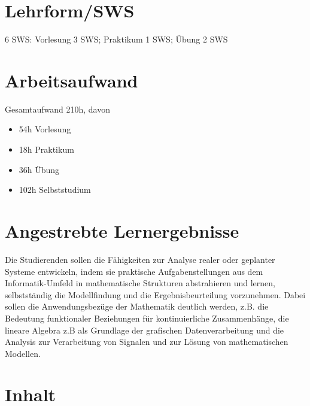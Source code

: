 \section*{Lehrform/SWS\label{/mi-2017/modulbeschreibungen-bachelor/BA_Mathematik1}}\label{lehrformswspathlabelmi-2017modulbeschreibungen-bachelorbaux5fmathematik1}

6 SWS: Vorlesung 3 SWS; Praktikum 1 SWS; Übung 2 SWS

\section*{Arbeitsaufwand\label{/mi-2017/modulbeschreibungen-bachelor/BA_Mathematik1}}\label{arbeitsaufwandpathlabelmi-2017modulbeschreibungen-bachelorbaux5fmathematik1}

Gesamtaufwand 210h, davon

\begin{itemize}
\tightlist
\item
  54h Vorlesung
\item
  18h Praktikum
\item
  36h Übung
\item
  102h Selbststudium
\end{itemize}

\section*{Angestrebte
Lernergebnisse\label{/mi-2017/modulbeschreibungen-bachelor/BA_Mathematik1}}\label{angestrebte-lernergebnissepathlabelmi-2017modulbeschreibungen-bachelorbaux5fmathematik1}

Die Studierenden sollen die Fähigkeiten zur Analyse realer oder
geplanter Systeme entwickeln, indem sie praktische Aufgabenstellungen
aus dem Informatik-Umfeld in mathematische Strukturen abstrahieren und
lernen, selbstständig die Modellfindung und die Ergebnisbeurteilung
vorzunehmen. Dabei sollen die Anwendungsbezüge der Mathematik deutlich
werden, z.B. die Bedeutung funktionaler Beziehungen für kontinuierliche
Zusammenhänge, die lineare Algebra z.B als Grundlage der grafischen
Datenverarbeitung und die Analysis zur Verarbeitung von Signalen und zur
Lösung von mathematischen Modellen.

\section*{Inhalt\label{/mi-2017/modulbeschreibungen-bachelor/BA_Mathematik1}}\label{inhaltpathlabelmi-2017modulbeschreibungen-bachelorbaux5fmathematik1}

